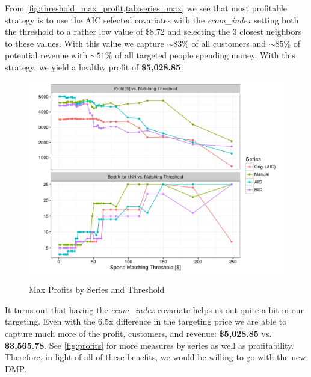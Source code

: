 From \vref{fig:threshold_max_profit,tab:series_max} we see that most profitable strategy is to use the AIC selected covariates with the \textit{ecom\_index} setting both the threshold to a rather low value of \$8.72 and selecting the 3 closest neighbors to these values.  With this value we capture $\sim83\%$ of all customers and $\sim85\%$ of potential revenue with $\sim51\%$ of all targeted people spending money.  With this strategy, we yield a healthy profit of \textbf{\$5,028.85}.

\begin{figure}[!htb]
  \centering
  \caption{Max Profits by Series and Threshold}
  \includegraphics[scale=.75]{threshold_max_profit2.pdf}
  \label{fig:threshold_max_profit}
\end{figure}



It turns out that having the \textit{ecom\_index} covariate helps us out quite a bit in our targeting.  Even with the 6.5x difference in the targeting price we are able to capture much more of the profit, customers, and revenue: \textbf{\$5,028.85} vs. \textbf{\$3,565.78}.  See \vref{fig:profits} for more measures by series as well as profitability.  Therefore, in light of all of these benefits, we would be willing to go with the new DMP.

